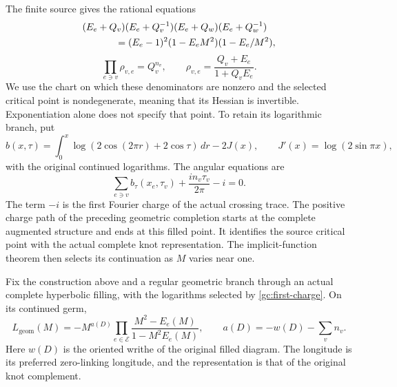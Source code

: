 The finite source gives the rational equations
\begin{equation}\label{gc:edge}
\begin{aligned}
 &(E_e+Q_v)(E_e+Q_v^{-1})(E_e+Q_w)(E_e+Q_w^{-1})\\
 &\hspace{12mm}=(E_e-1)^2(1-E_eM^2)(1-E_e/M^2),
\end{aligned}
\end{equation}
\begin{equation}\label{gc:vertex}
 \prod_{e\ni v}\rho_{v,e}=Q_v^{n_v},
 \qquad
 \rho_{v,e}=\frac{Q_v+E_e}{1+Q_vE_e}.
\end{equation}
We use the chart on which these denominators are nonzero and the
selected critical point is nondegenerate, meaning that its Hessian
is invertible. Exponentiation alone
does not specify that point. To retain its logarithmic branch, put
\[
 b(x,\tau)=\int_0^x
       \log(2\cos(2\pi r)+2\cos\tau)\,dr-2J(x),
 \qquad J'(x)=\log(2\sin\pi x),
\]
with the original continued logarithms. The angular equations are
\begin{equation}\label{gc:first-charge}
 \sum_{e\ni v}b_\tau(x_e,\tau_v)
            +\frac{i n_v\tau_v}{2\pi}-i=0.
\end{equation}
The term $-i$ is the first Fourier charge of the actual crossing
trace. The positive charge path of the preceding geometric
completion starts at the complete augmented structure and ends
at this filled point. It identifies the source critical point
with the actual complete knot representation. The implicit-function
theorem then selects its continuation as $M$ varies near one.

\begin{theorem}
\label{gc:longitude-theorem}
Fix the construction above and a regular geometric branch through
an actual complete hyperbolic filling, with the logarithms selected
by \eqref{gc:first-charge}. On its continued germ,
\begin{equation}\label{gc:longitude}
 \boxed{\displaystyle
 L_{\mathrm{geom}}(M)
   =-M^{a(D)}
          \prod_{e\in\mathcal E}\frac{M^2-E_e(M)}
                                      {1-M^2E_e(M)},\qquad
 a(D)=-w(D)-\sum_vn_v .}
\end{equation}
Here $w(D)$ is the oriented writhe of the original filled diagram.
The longitude is its preferred zero-linking longitude, and the
representation is that of the original knot complement.
\end{theorem}

